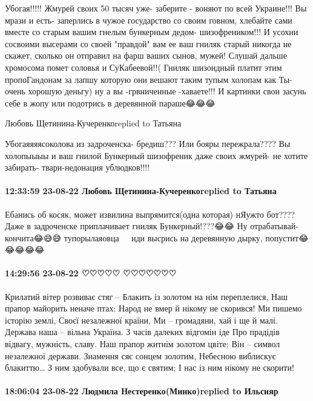 Убогая!!!!! Жмурей своих 50 тысяч уже- заберите - воняют по всей Украине!!! Вы
мрази и есть- заперлись в чужое государство со своим говном, хлебайте сами
вместе со старым вашим гнелым бункерным дедом- шизофреником!!! И усохни
сосвоими высерами со своей "правдой" вам ее ваш гниляк старый никогда не
скажет, сколько он отправил на фарш ваших сынов, мужей! Слушай дальше хромосома
помет соловья и СуКабеевой!!( Гниляк шизоидный платит этим пропоГандонам за
лапшу которую они вешают таким тупым холопам как Ты- очень хорошую деньгу) ну а
вы -грвниченные -хаваете!!! И картинки свои засунь себе в жопу или подотрись в
деревянной параше😂😂😂

Любовь Щетинина-Кучеренкоreplied to Татьяна

Убогаяяяясоколова из задроченска- бредиш??? Или бояры пережрала???? Вы
холопыыыы и ваш гнилой Бункерный шизофреник даже своих жмурей- не хотите
забирать- твари-недонация ублюдков!!!!

\paragraph{12:33:59 23-08-22 Любовь Щетинина-Кучеренкоreplied to Татьяна}

Ебанись об косяк, может извилина выпрямится(одна которая) нЯужто бот???? Даже в
задроченске приплачивает гниляк Бункерный!???😂😂 Ну отрабатывай- кончита😂😅😅
тупорылаяовца🐑🐑🐑🐑 иди высрись на деревянную дырку, попустит😂😂😂😂😂

\paragraph{14:29:56 23-08-22 ♡♡♡♡♡ ♡♡♡♡♡♡♡}

Крилатий вітер розвиває стяг –
Блакить із золотом на нім переплелися,
Наш прапор майорить неначе птах:
Народ не вмер й нікому не скорився!
Ми пишемо історію землі,
Своєї незалежної країни,
Ми – громадяни, хай і ще й малі.
Держава наша – вільна Україна.
З часів далеких відгомін іде
Про прадідів відвагу, мужність, славу.
Наш прапор житнім золотом цвіте;
Він – символ незалежної держави.
Знамення сяє сонцем золотим,
Небесною виблискує блакиттю…
З ним здобували все, що є святим;
І нас із ним нікому не скорити!

\paragraph{18:06:04 23-08-22 Людмила Нестеренко(Минко)replied to Ильсияр}

